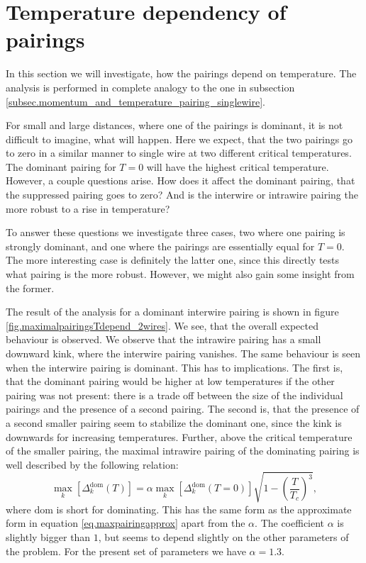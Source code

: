 \section{Temperature dependency of pairings}
In this section we will investigate, how the pairings depend on temperature. The analysis is performed in complete analogy to the one in subsection \ref{subsec.momentum_and_temperature_pairing_singlewire}. 

For small and large distances, where one of the pairings is dominant, it is not difficult to imagine, what will happen. Here we expect, that the two pairings go to zero in a similar manner to single wire at two different critical temperatures. The dominant pairing for $T = 0$ will have the highest critical temperature. However, a couple questions arise. How does it affect the dominant pairing, that the suppressed pairing goes to zero? And is the interwire or intrawire pairing the more robust to a rise in temperature?

To answer these questions we investigate three cases, two where one pairing is strongly dominant, and one where the pairings are essentially equal for $T = 0$. The more interesting case is definitely the latter one, since this directly tests what pairing is the more robust. However, we might also gain some insight from the former. 

The result of the analysis for a dominant interwire pairing is shown in figure \ref{fig.maximalpairingsTdepend_2wires}. We see, that the overall expected behaviour is observed. We observe that the intrawire pairing has a small downward kink, where the interwire pairing vanishes. The same behaviour is seen when the interwire pairing is dominant. This has to implications. The first is, that the dominant pairing would be higher at low temperatures if the other pairing was not present: there is a trade off between the size of the individual pairings and the presence of a second pairing. The second is, that the presence of a second smaller pairing seem to stabilize the dominant one, since the kink is downwards for increasing temperatures. Further, above the critical temperature of the smaller pairing, the maximal intrawire pairing of the dominating pairing is well described by the following relation:
\begin{equation}
\max_k[\Delta^{\text{dom}}_k(T)] = \alpha \max_k[\Delta^{\text{dom}}_k(T = 0)] \sqrt{1 - \left(\frac{T}{T_c}\right)^3},
\label{eq.DeltaapproxaboveTC1}
\end{equation}
where $\text{dom}$ is short for dominating. This has the same form as the approximate form in equation \eqref{eq.maxpairingapprox} apart from the $\alpha$. The coefficient $\alpha$ is slightly bigger than $1$, but seems to depend slightly on the other parameters of the problem. For the present set of parameters we have $\alpha = 1.3$. 


